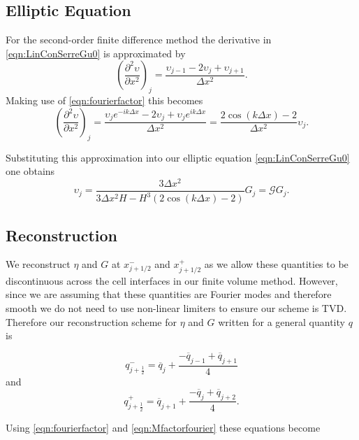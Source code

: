\subsection{Elliptic Equation}

For the second-order finite difference method the derivative in \eqref{eqn:LinConSerreGu0} is approximated by   
\[ \left(\frac{\partial^2 \upsilon}{\partial x^2}\right)_j = \frac{\upsilon_{j-1} - 2\upsilon_{j} + \upsilon_{j+1}}{\Delta x^2}.\]
Making use of \eqref{eqn:fourierfactor} this becomes
\[ \left(\frac{\partial^2 \upsilon}{\partial x^2}\right)_j = \frac{\upsilon_{j} e^{-ik\Delta x} - 2\upsilon_{j} + \upsilon_{j}e^{ik\Delta x}}{\Delta x^2} = \frac{ 2\cos\left(k\Delta x\right) - 2 }{\Delta x^2} \upsilon_{j}.\]

Substituting this approximation into our elliptic equation \eqref{eqn:LinConSerreGu0} one obtains
\begin{equation}
\label{eqn:Gfactorfourier}
\upsilon_j = \frac{3 \Delta x^2}{3 \Delta x^2 H - H^3 \left(2\cos\left(k\Delta x\right) - 2\right)} G_{j} = \mathcal{G} G_{j}.
\end{equation}

\subsection{Reconstruction}
We reconstruct $\eta$ and $G$ at $x^-_{j+1/2}$ and $x^+_{j+1/2}$ as we allow these quantities to be discontinuous across the cell interfaces in our finite volume method. However, since we are assuming that these quantities are Fourier modes and therefore smooth we do not need to use non-linear limiters to ensure our scheme is TVD. Therefore our reconstruction scheme for $\eta$ and $G$ written for a general quantity $q$ is

\begin{equation*}
q^-_{j+\frac{1}{2}} = \overline{q}_j + \frac{- \overline{q}_{j - 1} + \overline{q}_{j+ 1} }{4}
\end{equation*}
and
\begin{equation*}
q^+_{j+\frac{1}{2}} = \overline{q}_{j+1} + \frac{- \overline{q}_{j} + \overline{q}_{j+ 2}}{4}.
\end{equation*}

Using \eqref{eqn:fourierfactor} and \eqref{eqn:Mfactorfourier} these equations become

